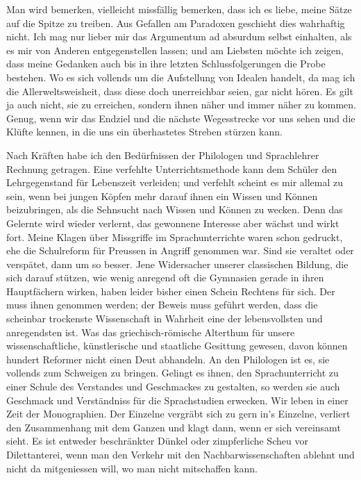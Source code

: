 Man wird bemerken, vielleicht missfällig bemerken, dass ich es liebe, meine Sätze auf die Spitze zu treiben. Aus Gefallen am Paradoxen geschieht dies  wahrhaftig nicht. Ich mag nur lieber mir das Argumentum ad absurdum selbst einhalten, als es mir von Anderen entgegenstellen lassen; und am Liebsten möchte ich zeigen, dass meine Gedanken auch bis in ihre letzten Schlussfolgerungen die Probe bestehen. Wo es sich vollends um die Aufstellung von Idealen handelt, da mag ich die Allerweltsweisheit, dass diese doch unerreichbar seien, gar nicht hören. Es gilt ja auch nicht, sie zu erreichen, sondern ihnen näher und immer näher zu kommen. Genug, wenn wir das Endziel und die nächste Wegesstrecke vor uns sehen und die Klüfte kennen, in die uns ein überhastetes Streben stürzen kann.

Nach Kräften habe ich den Bedürfnissen der Philologen und Sprachlehrer Rechnung getragen. Eine verfehlte Unterrichtsmethode kann dem Schüler den Lehrgegenstand für Lebenszeit verleiden; und verfehlt scheint es mir allemal zu sein, wenn bei jungen Köpfen mehr darauf  ihnen ein Wissen und Können beizubringen, als die Sehnsucht nach Wissen und Können zu wecken. Denn das Gelernte wird wieder verlernt, das gewonnene Interesse aber wächst und wirkt fort. Meine Klagen über Missgriffe im Sprachunterrichte waren schon gedruckt, ehe die Schulreform für Preussen in Angriff genommen war. Sind sie veraltet  oder verspätet, dann um so besser. Jene Widersacher unserer classischen Bildung, die sich darauf stützen, wie wenig anregend oft die Gymnasien gerade in ihren Hauptfächern wirken, haben leider bisher einen Schein Rechtens für sich. Der muss ihnen genommen werden; der Beweis muss geführt werden, dass die scheinbar trockenste Wissenschaft in Wahrheit eine der lebensvollsten und anregendsten ist. Was das griechisch-römische Alterthum für unsere wissenschaftliche, künstlerische und staatliche Gesittung gewesen, davon können hundert Reformer nicht einen Deut abhandeln. An den Philologen ist es, sie vollends zum Schweigen zu bringen. Gelingt es ihnen, den Sprachunterricht zu einer Schule des Verstandes und Geschmackes zu gestalten, so werden sie auch Geschmack und Verständniss für die Sprachstudien erwecken. Wir leben in einer Zeit der Monographien. Der Einzelne vergräbt sich zu gern in’s Einzelne, verliert den Zusammenhang mit dem Ganzen und klagt dann, wenn er sich vereinsamt sieht. Es ist entweder beschränkter Dünkel oder zimpferliche Scheu vor Dilettanterei, wenn man den Verkehr mit den Nachbarwissenschaften ablehnt und nicht da mitgeniessen will, wo man nicht mitschaffen kann.

